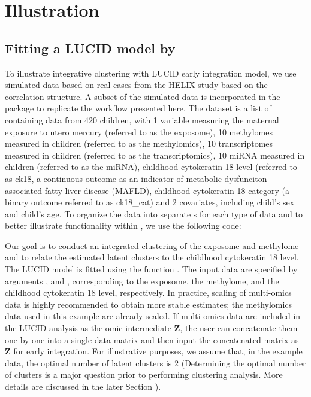 \section{Illustration} \label{sec3}
\subsection{Fitting a LUCID model by } \label{sec3.1}
To illustrate integrative clustering with LUCID early integration model, we use simulated data based on real cases from the HELIX study based on the correlation structure. A subset of the simulated data is incorporated in the  package to replicate the workflow presented here. The dataset is a list of  containing data from 420 children, with 1 variable measuring the maternal exposure to utero mercury (referred to as the exposome), 10 methylomes measured in children (referred to as the methylomics), 10 transcriptomes measured in children (referred to as the transcriptomics), 10 miRNA measured in children (referred to as the miRNA), childhood cytokeratin 18 level (referred to as ck18, a continuous outcome as an indicator of metabolic-dysfunciton-associated fatty liver disease (MAFLD), childhood cytokeratin 18 category (a binary outcome referred to as ck18\_cat) and 2 covariates, including child's sex and child's age. To organize the data into separate s for each type of data and to better illustrate functionality within , we use the following code: 
Our goal is to conduct an integrated clustering of the exposome and methylome and to relate the estimated latent clusters to the childhood cytokeratin 18 level. The LUCID model is fitted using the function . The input data are specified by arguments ,  and , corresponding to the exposome, the methylome, and the childhood cytokeratin 18 level, respectively. In practice, scaling of multi-omics data is highly recommended to obtain more stable estimates; the methylomics data used in this example are already scaled. If multi-omics data are included in the LUCID analysis as the omic intermediate $\bm Z$, the user can concatenate them one by one into a single data matrix and then input the concatenated matrix as $\bm Z$ for early integration. For illustrative purposes, we assume that, in the example data, the optimal number of latent clusters is 2 (Determining the optimal number of clusters is a major question prior to performing clustering analysis. More details are discussed in the later Section ). 
